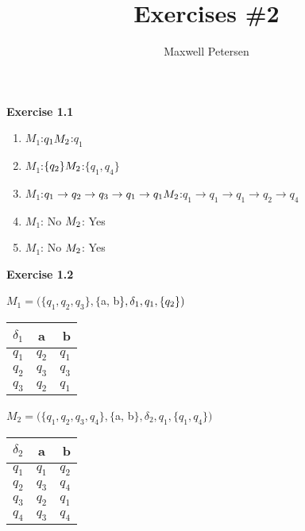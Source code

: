 \documentclass{article}
\title{Exercises \#2}
\author{Maxwell Petersen}
\makeatletter
\newcommand\exercise[1]{\par\vspace{4ex}\normalfont\normalsize\noindent
\textbf{\large Exercise #1}\par\nobreak\@afterindentfalse\@afterheading}
\makeatother
\begin{document}
\maketitle

\exercise{1.1}
\begin{enumerate}
\item $M_1 $:$ q_1 \newline M_2 $:$ q_1$
\item $M_1 $:$ \{q_2\} \newline M_2 $:$ \{q_1, q_4\}$
\item $M_1 $:$ q_1 \rightarrow q_2 \rightarrow q_3 \rightarrow q_1 \rightarrow q_1 \newline M_2 $:$ q_1 \rightarrow q_1 \rightarrow q_1 \rightarrow q_2 \rightarrow q_4$
\item $M_1 $: No $\newline M_2 $: Yes
\item $M_1 $: No $\newline M_2 $: Yes
\end{enumerate}

\exercise{1.2}
$M_1 = (\{q_1, q_2, q_3\}, \{$a, b$\}, \delta_1, q_1, \{q_2\})\newline$
\begin{table}[h!]
  \begin{center}
    \label{tab:table1}
    \begin{tabular}{l|c r}
       $\delta_1$   &  a  &  b \\
      \hline
      $q_1$ & $q_2$ & $q_1$\\
      $q_2$ & $q_3$ & $q_3$\\
      $q_3$ & $q_2$ & $q_1$\\
    \end{tabular}
  \end{center}
\end{table}
$M_2 = (\{q_1, q_2, q_3, q_4\}, \{$a, b$\}, \delta_2, q_1, \{q_1, q_4\})$
\begin{table}[h!]
  \begin{center}
    \begin{tabular}{l|c r}
      $\delta_2$  &  a  &  b \\
      \hline
      $q_1$ & $q_1$ & $q_2$\\
      $q_2$ & $q_3$ & $q_4$\\
      $q_3$ & $q_2$ & $q_1$\\
      $q_4$ & $q_3$ & $q_4$\\
    \end{tabular}
  \end{center}
\end{table}
\end{document}
